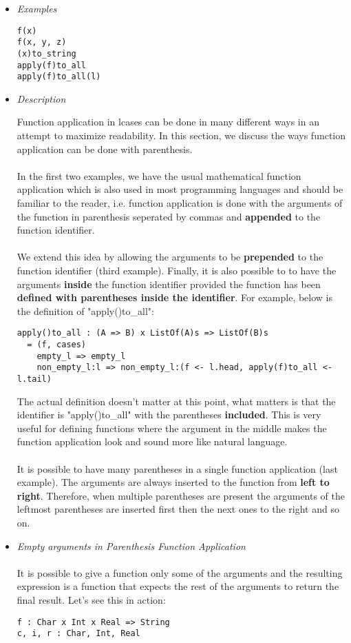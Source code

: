 \documentclass{article}
\begin{document}
\begin{itemize}
\item \textit{Examples}

\begin{verbatim}
f(x)
f(x, y, z)
(x)to_string
apply(f)to_all
apply(f)to_all(l)
\end{verbatim}

\item \textit{Description}

Function application in lcases can be done in many different ways in an attempt to 
maximize readability. In this section, we discuss the ways function application can
be done with parenthesis.
\\\\
In the first two examples, we have the usual mathematical
function application which is also used in most programming languages and
should be familiar to the reader, i.e. function application is done with the 
arguments of the function in parenthesis seperated by commas and \textbf{appended}
to the function identifier.
\\\\
We extend this idea by allowing the arguments to be \textbf{prepended} to the
function identifier (third example). Finally, it is also possible to to have
the arguments \textbf{inside} the function identifier provided the function has
been \textbf{defined with parentheses inside the identifier}. For example,
below is the definition of "apply()to\_all":

\begin{verbatim}
apply()to_all : (A => B) x ListOf(A)s => ListOf(B)s
  = (f, cases)
    empty_l => empty_l
    non_empty_l:l => non_empty_l:(f <- l.head, apply(f)to_all <- l.tail)
\end{verbatim}
The actual definition doesn't matter at this point, what matters is that the 
identifier is "apply()to\_all" with the parentheses \textbf{included}. This is very
useful for defining functions where the argument in the middle makes the function
application look and sound more like natural language.
\\\\
It is possible to have many parentheses in a single function application (last
example). The arguments are always inserted to the function from \textbf{left
to right}.  Therefore, when multiple parentheses are present the arguments of
the leftmost parentheses are inserted first then the next ones to the right and
so on.

\item \textit{Empty arguments in Parenthesis Function Application}
\\\\
It is possible to give a function only some of the arguments and the resulting
expression is a function that expects the rest of the arguments to return the final
result. Let's see this in action:
\begin{verbatim}
f : Char x Int x Real => String
c, i, r : Char, Int, Real


\end{verbatim}
\end{itemize}
\end{document}

